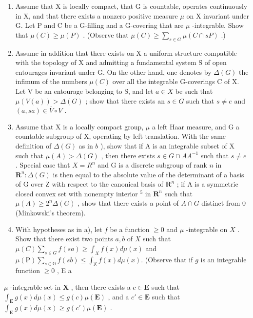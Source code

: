 \begin{enumerate}
\def\labelenumi{\alph{enumi})}
\item
  Assume that X is locally compact, that G is countable, operates continuously in X, and that there exists a nonzero positive measure \(\mu\) on X invariant under G. Let P and C be a G-filling and a G-covering that are \(\mu\) -integrable. Show that \(\mu(C) \geqslant \mu(P)\) . (Observe that \(\mu(C) \geqslant \sum_{s \in G} \mu(C \cap sP)\) .)
\item
  Assume in addition that there exists on X a uniform structure compatible with the topology of X and admitting a fundamental system S of open entourages invariant under G. On the other hand, one denotes by \(\Delta(G)\) the infimum of the numbers \(\mu(C)\) over all the integrable G-coverings C of X. Let V be an entourage belonging to S, and let \(a \in X\) be such that \(\mu(V(a)) > \Delta(G)\) ; show that there exists an \(s \in G\) such that \(s \neq e\) and \((a, sa) \in \overline{V} \circ V\) .
\item
  Assume that X is a locally compact group, \(\mu\) a left Haar measure, and G a countable subgroup of X, operating by left translation. With the same definition of \(\Delta(G)\) as in \(b\) ), show that if A is an integrable subset of X such that \(\mu(A) > \Delta(G)\) , then there exists \(s \in G \cap AA^{-1}\) such that \(s \neq e\) . Special case that \(X = R^n\) and G is a discrete subgroup of rank \(n\) in \(\mathbf{R}^n: \Delta(G)\) is then equal to the absolute value of the determinant of a basis of G over Z with respect to the canonical basis of \(\mathbf{R}^n\) ; if A is a symmetric closed convex set with nonempty interior \(^5\) in \(\mathbf{R}^n\) such that \(\mu(A) \geqslant 2^n \Delta(G)\) , show that there exists a point of \(A \cap G\) distinct from 0 (Minkowski's theorem).
\item
  With hypotheses as in a), let \(f\) be a function \(\geqslant 0\) and \(\mu\) -integrable on \(X\) . Show that there exist two points \(a, b\) of \(X\) such that \(\mu(C) \sum_{s \in G} f(sa) \geqslant \int_X f(x) d\mu(x)\) and \(\mu (\mathrm{P})\sum_{s\in \mathbb{G}}f(sb)\leqslant \int_{\mathbb{X}}f(x)d\mu (x).\) (Observe that if \(g\) is an integrable function \(\geqslant 0\) , E a
\end{enumerate}

\(\mu\) -integrable set in \(\mathbf{X}\) , then there exists a \(c \in \mathbf{E}\) such that \(\int_{\mathbf{E}} g(x) d\mu(x) \leqslant g(c)\mu(\mathbf{E})\) , and a \(c' \in \mathbf{E}\) such that \(\int_{\mathbf{E}} g(x) d\mu(x) \geqslant g(c')\mu(\mathbf{E})\) .

